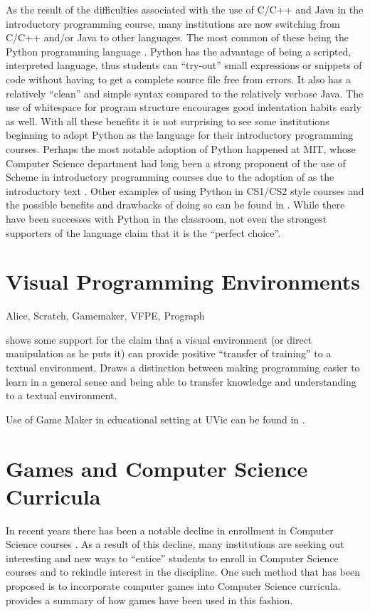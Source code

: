 As the result of the difficulties associated with the use of C/C++ and Java in the introductory programming course, many institutions are now switching from C/C++ and/or Java to other languages.  The most common of these being the Python programming language \cite{python}.  Python has the advantage of being a scripted, interpreted language, thus students can ``try-out'' small expressions or snippets of code without having to get a complete source file free from errors.  It also has a relatively ``clean'' and simple syntax compared to the relatively verbose Java.  The use of whitespace for program structure encourages good indentation habits early as well.  With all these benefits it is not surprising to see some institutions beginning to adopt Python as the language for their introductory programming courses.  Perhaps the most notable adoption of Python happened at MIT, whose Computer Science department had long been a strong proponent of the use of Scheme in introductory programming courses due to the adoption of \cite{SICPbook} as the introductory text \cite{Thetech06}.  Other examples of using Python in CS1/CS2 style courses and the possible benefits and drawbacks of doing so can be found in \cite{Radenski06,Shannon03,Agarwal05,Agarwal08}.  While there have been successes with Python in the classroom, not even the strongest supporters of the language claim that it is the ``perfect choice''.

\section{Visual Programming Environments}

Alice, Scratch, Gamemaker, VFPE, Prograph

\cite{Hundhausen09} shows some support for the claim that a visual environment (or direct manipulation as he puts it) can provide positive ``transfer of training'' to a textual environment.  Draws a distinction between making programming easier to learn in a general sense and being able to transfer knowledge and understanding to a textual environment.

Use of Game Maker in educational setting at UVic can be found in \cite{Gooch08}.


\section{Games and Computer Science Curricula}
\label{chapter:problemSec:games}

In recent years there has been a notable decline in enrollment in Computer Science courses \cite{Manaris07,Vesgo07,Ward08,Bayliss09}.  As a result of this decline, many institutions are seeking out interesting and new ways to ``entice'' students to enroll in Computer Science courses and to rekindle interest in the discipline.  One such method that has been proposed is to incorporate computer games into Computer Science curricula.  \cite{Cliburn06} provides a summary of how games have been used in this fashion.


